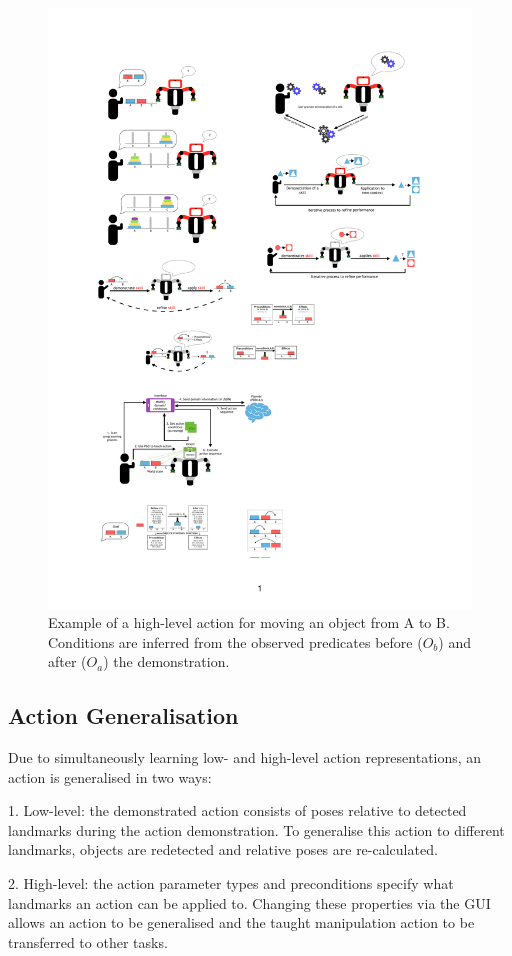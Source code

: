  
 \begin{figure}[h]
 	\centering
 	\includegraphics[width=0.6\linewidth]{figures/high-level.pdf}
 	\caption{Example of a high-level action for moving an object from A to B. Conditions are inferred from the observed predicates before ($O_b$) and after ($O_a$) the demonstration.
 	}
 	\label{fig:action-model}
 \end{figure}
 
\subsection{Action Generalisation}
\label{sec:generalisation}
Due to simultaneously learning low- and high-level action representations, an action is generalised in two ways:

1. Low-level: the demonstrated action consists of poses relative to detected landmarks during the action demonstration. 
To generalise this action to different landmarks, objects are redetected and relative poses are re-calculated.

2. High-level: the action parameter types and preconditions specify what landmarks an action can be applied to. 
Changing these properties via the GUI allows an action to be generalised and the taught manipulation action to be transferred to other tasks.


